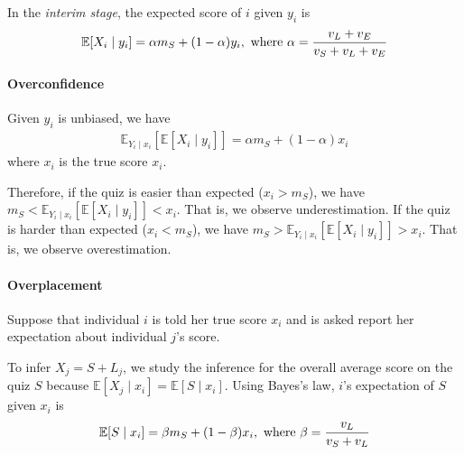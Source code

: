\documentclass[11pt]{elegantbook}
\begin{document}
In the \textit{interim stage}, the expected score of $i$ given $y_i$ is
\begin{equation}
    \begin{aligned}
        \mathbb{E}[X_i\mid y_i]=\alpha m_S +(1-\alpha)y_i, \textnormal{ where }\alpha=\frac{v_L+v_E}{v_S+v_L+v_E}
    \end{aligned}
    \nonumber
\end{equation}
\paragraph*{Overconfidence} Given $y_i$ is unbiased, we have
\begin{equation}
    \begin{aligned}
        \mathbb{E}_{Y_i\mid x_i}[\mathbb{E}[X_i\mid y_i]]=\alpha m_S +(1-\alpha)x_i
    \end{aligned}
    \nonumber
\end{equation}
where $x_i$ is the true score $x_i$.

Therefore, if the quiz is easier than expected ($x_i>m_S$), we have $m_S<\mathbb{E}_{Y_i\mid x_i}[\mathbb{E}[X_i\mid y_i]]<x_i$. That is, we observe underestimation. If the quiz is harder than expected ($x_i<m_S$), we have $m_S>\mathbb{E}_{Y_i\mid x_i}[\mathbb{E}[X_i\mid y_i]]>x_i$. That is, we observe overestimation.

\paragraph*{Overplacement}
Suppose that individual $i$ is told her true score $x_i$ and is asked report her expectation about individual $j$'s score.

To infer $X_j=S+L_j$, we study the inference for the overall average score on the quiz $S$ because $\mathbb{E}[X_j\mid x_i]=\mathbb{E}[S\mid x_i]$. Using Bayes's law, $i$'s expectation of $S$ given $x_i$ is
\begin{equation}
    \begin{aligned}
        \mathbb{E}[S\mid x_i]=\beta m_S + (1-\beta)x_i, \textnormal{ where }\beta=\frac{v_L}{v_S+v_L}
    \end{aligned}
    \nonumber
\end{equation}









































\end{document}
